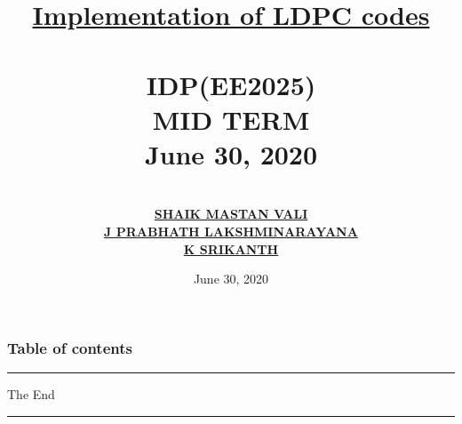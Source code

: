 \documentclass[9pt]{beamer}
\title[short title]{\underline{\Huge Implementation of LDPC codes}\\~\\ \Large IDP(EE2025)\\ \Large MID TERM \\ \Large June 30, 2020}
\author{\\ \underline{ \textbf{SHAIK MASTAN VALI}} \\ \underline{ \textbf{J\; PRABHATH LAKSHMINARAYANA}}\\ \underline{\textbf{K \;SRIKANTH}}\\}
\institute{\textbf{\underline{\large Mentor}: Dr. Shashank Vatedka} \\ \textbf{\large INDIAN INSTITUTE OF TECHNOLOGY, HYDERABAD}}
\date{June 30, 2020}
\begin{document}
\titlepage

\begin{frame}
 \frametitle{Table of contents}
 \tableofcontents
\end{frame}






\begin{frame}
\noindent
{\color{purple} \rule{\linewidth}{0.5mm} }
\color{purple}
\Huge{\centerline{The End}}
\noindent
{\color{purple} \rule{\linewidth}{0.5mm} }
\end{frame}
\end{document}

